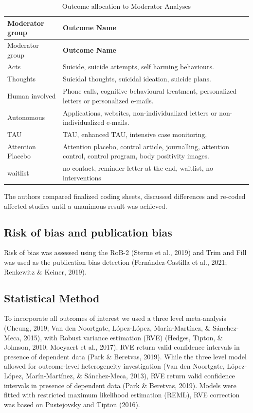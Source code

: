 \documentclass[
  english,
  man]{apa6}
\begin{document}
\begin{longtable}[]{@{}
  >{\raggedright\arraybackslash}p{}
  >{\raggedright\arraybackslash}p{}@{}}
\caption{Outcome allocation to Moderator Analyses}\tabularnewline
\toprule
Moderator group & \textbf{Outcome Name} \\
\midrule
\endfirsthead
\toprule
Moderator group & \textbf{Outcome Name} \\
\midrule
\endhead
Acts & Suicide, suicide attempts, self harming behaviours. \\
Thoughts & Suicidal thoughts, suicidal ideation, suicide plans. \\
Human involved & Phone calls, cognitive behavioural treatment, personalized letters or personalized e-mails. \\
Autonomous & Applications, websites, non-individualized letters or non-individualized e-mails. \\
TAU & TAU, enhanced TAU, intensive case monitoring, \\
Attention Placebo & Attention placebo, control article, journalling, attention control, control program, body positivity images. \\
waitlist & no contact, reminder letter at the end, waitlist, no interventions \\
\bottomrule
\end{longtable}

The authors compared finalized coding sheets, discussed differences and re-coded affected studies until a unanimous result was achieved.

\hypertarget{risk-of-bias-and-publication-bias}{%
\subsection{Risk of bias and publication bias}\label{risk-of-bias-and-publication-bias}}

Risk of bias was assessed using the RoB-2 (Sterne et al., 2019) and Trim and Fill was used as the publication bias detection (Fernández-Castilla et al., 2021; Renkewitz \& Keiner, 2019).

\hypertarget{statistical-method}{%
\subsection{Statistical Method}\label{statistical-method}}

To incorporate all outcomes of interest we used a three level meta-analysis (Cheung, 2019; Van den Noortgate, López-López, Marín-Martínez, \& Sánchez-Meca, 2015), with Robust variance estimation (RVE) (Hedges, Tipton, \& Johnson, 2010; Moeyaert et al., 2017). RVE return valid confidence intervals in presence of dependent data (Park \& Beretvas, 2019). While the three level model allowed for outcome-level heterogeneity investigation (Van den Noortgate, López-López, Marín-Martínez, \& Sánchez-Meca, 2013), RVE return valid confidence intervals in presence of dependent data (Park \& Beretvas, 2019). Models were fitted with restricted maximum likelihood estimation (REML), RVE correction was based on Pustejovsky and Tipton (2016).
\end{document}
